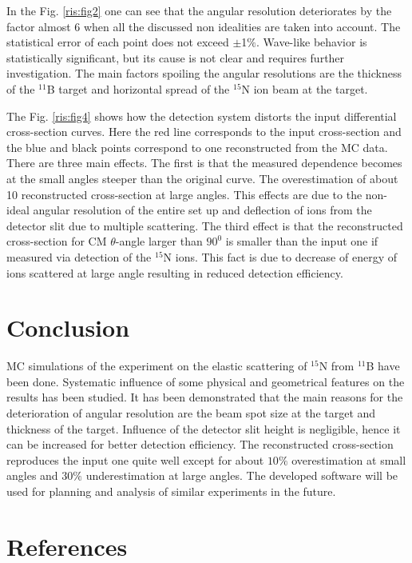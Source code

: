 \documentclass[%
 aip,
cp,  %
 amsmath,amssymb,%
 reprint,%
]{revtex4-2}
\begin{document}
In the Fig. \ref{ris:fig2} one can see that the angular resolution deteriorates by the factor almost 6 when all the discussed non idealities are taken into account. The statistical error of each point does not exceed $\pm$1$\%$. Wave-like behavior is statistically significant, but its cause is not clear and requires further investigation. The main factors spoiling the angular resolutions are the thickness of the ${}^{11}$B target and horizontal spread of the ${}^{15}$N ion beam at the target.

The Fig. \ref{ris:fig4} shows how the detection system distorts the
input differential cross-section curves. Here the red line corresponds
to the input cross-section and the blue and black points correspond to
one reconstructed from the MC data. There are three main effects. The
first is that the measured dependence becomes at the small
angles steeper than the original curve. The overestimation of about 10%
reconstructed cross-section at large angles. This effects are due to the
non-ideal angular resolution of the entire set up and deflection of ions from the detector slit due to multiple scattering. The third effect is
that the reconstructed cross-section for CM $\theta$-angle larger than
$90^0$ is smaller than the input one if measured via detection of the
${}^{15}$N ions.
This fact is due to decrease of energy of ions scattered at large angle
resulting in reduced detection efficiency.

\section{Conclusion}

MC simulations of the experiment on the elastic scattering of ${}^{15}$N  from ${}^{11}$B have been done. Systematic influence of some physical and geometrical features on the results has been studied. It has been demonstrated that the main reasons for the deterioration of angular resolution are the beam spot size at the target and thickness of the target. Influence of the detector slit height is negligible, hence it can be increased for better detection efficiency. The reconstructed cross-section reproduces the input one quite well except for about $10\%$ overestimation at small angles and $30\%$ underestimation at large angles. The developed software will be used for planning and analysis of similar experiments in the future.

\section{References}
\end{document}
